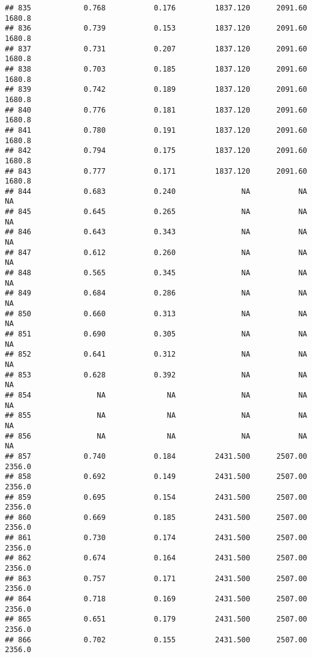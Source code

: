 \documentclass[
]{article}
\begin{document}
\begin{verbatim}
## 835            0.768           0.176         1837.120      2091.60       1680.8
## 836            0.739           0.153         1837.120      2091.60       1680.8
## 837            0.731           0.207         1837.120      2091.60       1680.8
## 838            0.703           0.185         1837.120      2091.60       1680.8
## 839            0.742           0.189         1837.120      2091.60       1680.8
## 840            0.776           0.181         1837.120      2091.60       1680.8
## 841            0.780           0.191         1837.120      2091.60       1680.8
## 842            0.794           0.175         1837.120      2091.60       1680.8
## 843            0.777           0.171         1837.120      2091.60       1680.8
## 844            0.683           0.240               NA           NA           NA
## 845            0.645           0.265               NA           NA           NA
## 846            0.643           0.343               NA           NA           NA
## 847            0.612           0.260               NA           NA           NA
## 848            0.565           0.345               NA           NA           NA
## 849            0.684           0.286               NA           NA           NA
## 850            0.660           0.313               NA           NA           NA
## 851            0.690           0.305               NA           NA           NA
## 852            0.641           0.312               NA           NA           NA
## 853            0.628           0.392               NA           NA           NA
## 854               NA              NA               NA           NA           NA
## 855               NA              NA               NA           NA           NA
## 856               NA              NA               NA           NA           NA
## 857            0.740           0.184         2431.500      2507.00       2356.0
## 858            0.692           0.149         2431.500      2507.00       2356.0
## 859            0.695           0.154         2431.500      2507.00       2356.0
## 860            0.669           0.185         2431.500      2507.00       2356.0
## 861            0.730           0.174         2431.500      2507.00       2356.0
## 862            0.674           0.164         2431.500      2507.00       2356.0
## 863            0.757           0.171         2431.500      2507.00       2356.0
## 864            0.718           0.169         2431.500      2507.00       2356.0
## 865            0.651           0.179         2431.500      2507.00       2356.0
## 866            0.702           0.155         2431.500      2507.00       2356.0

\end{verbatim}
\end{document}
